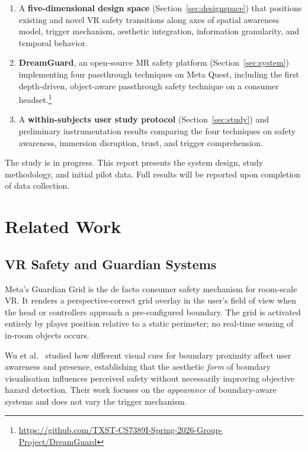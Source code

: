 \documentclass{styling/vgtc} %
\begin{document}
\begin{enumerate}

  \item A \textbf{five-dimensional design space} (Section~\ref{sec:designspace})
    that positions existing and novel VR safety transitions along axes of
    spatial awareness model, trigger mechanism, aesthetic integration,
    information granularity, and temporal behavior.

  \item \textbf{DreamGuard}, an open-source MR safety platform (Section~\ref{sec:system})
    implementing four passthrough techniques on Meta Quest, including the
    first depth-driven, object-aware passthrough safety technique on a
    consumer headset.\footnote{\url{https://github.com/TXST-CS7389I-Spring-2026-Group-Project/DreamGuard}}

  \item A \textbf{within-subjects user study protocol} (Section~\ref{sec:study})
    and preliminary instrumentation results comparing the four techniques
    on safety awareness, immersion disruption, trust, and trigger
    comprehension.

\end{enumerate}

The study is in progress. This report presents the system design, study
methodology, and initial pilot data. Full results will be reported upon
completion of data collection.


\section{Related Work}

\subsection{VR Safety and Guardian Systems}

Meta's Guardian Grid is the de facto consumer safety mechanism for
room-scale VR. It renders a perspective-correct grid overlay in the
user's field of view when the head or controllers approach a
pre-configured boundary. The grid is activated entirely by player
position relative to a static perimeter; no real-time sensing of
in-room objects occurs.

Wu et al.~\cite{wu2023guardian} studied how different visual cues for
boundary proximity affect user awareness and presence, establishing that
the aesthetic \emph{form} of boundary visualisation influences perceived
safety without necessarily improving objective hazard detection. Their
work focuses on the \emph{appearance} of boundary-aware systems and does
not vary the trigger mechanism.
\end{document}

